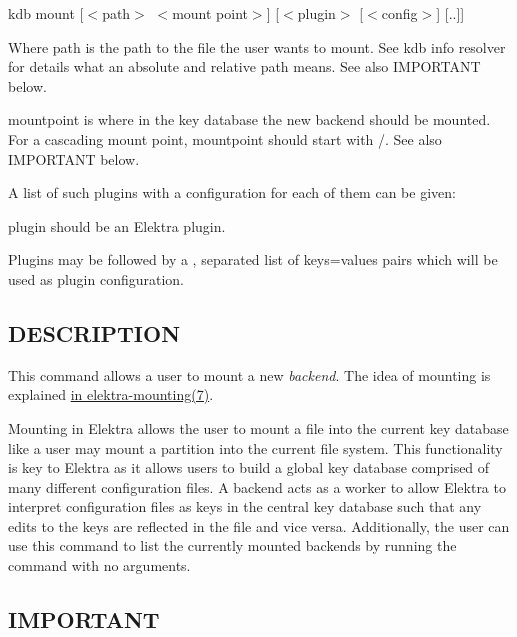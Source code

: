 {\ttfamily kdb mount \mbox{[}$<$path$>$ $<$mount point$>$\mbox{]} \mbox{[}$<$plugin$>$ \mbox{[}$<$config$>$\mbox{]} \mbox{[}..\mbox{]}\mbox{]}}~\newline



\begin{DoxyItemize}
\item Where {\ttfamily path} is the path to the file the user wants to mount. See {\ttfamily kdb info resolver} for details what an absolute and relative path means. See also I\+M\+P\+O\+R\+T\+A\+NT below.
\item {\ttfamily mountpoint} is where in the key database the new backend should be mounted. For a cascading mount point, {\ttfamily mountpoint} should start with {\ttfamily /}. See also I\+M\+P\+O\+R\+T\+A\+NT below.
\item A list of such plugins with a configuration for each of them can be given\+:
\begin{DoxyItemize}
\item {\ttfamily plugin} should be an Elektra plugin.
\item Plugins may be followed by a {\ttfamily ,} separated list of {\ttfamily keys=values} pairs which will be used as plugin configuration.
\end{DoxyItemize}
\end{DoxyItemize}

\subsection*{D\+E\+S\+C\+R\+I\+P\+T\+I\+ON}

This command allows a user to mount a new {\itshape backend}. The idea of mounting is explained \hyperlink{md_doc_help_elektra-mounting_doc_help_elektra-mounting_md}{in elektra-\/mounting(7)}.

Mounting in Elektra allows the user to mount a file into the current key database like a user may mount a partition into the current file system. This functionality is key to Elektra as it allows users to build a global key database comprised of many different configuration files. A backend acts as a worker to allow Elektra to interpret configuration files as keys in the central key database such that any edits to the keys are reflected in the file and vice versa. Additionally, the user can use this command to list the currently mounted backends by running the command with no arguments.

\subsection*{I\+M\+P\+O\+R\+T\+A\+NT}


